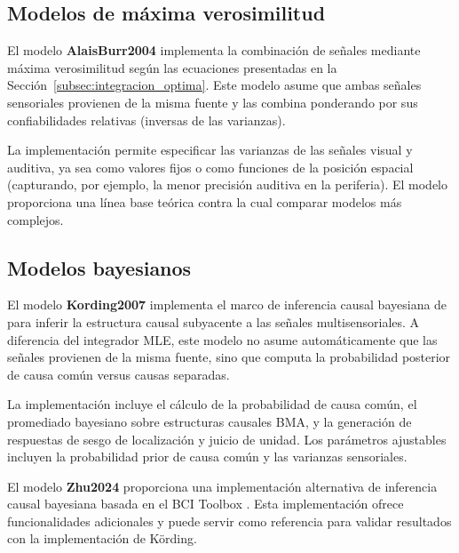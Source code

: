 \subsection{Modelos de máxima verosimilitud}
\label{subsec:snmsi_mle}

El modelo \textbf{AlaisBurr2004} implementa la combinación de señales mediante máxima verosimilitud según las ecuaciones presentadas en la Sección~\ref{subsec:integracion_optima}. Este modelo asume que ambas señales sensoriales provienen de la misma fuente y las combina ponderando por sus confiabilidades relativas (inversas de las varianzas).

La implementación permite especificar las varianzas de las señales visual y auditiva, ya sea como valores fijos o como funciones de la posición espacial (capturando, por ejemplo, la menor precisión auditiva en la periferia). El modelo proporciona una línea base teórica contra la cual comparar modelos más complejos.

\subsection{Modelos bayesianos}
\label{subsec:snmsi_bayesianos}

El modelo \textbf{Kording2007} implementa el marco de inferencia causal bayesiana de \citet{kording2007causal} para inferir la estructura causal subyacente a las señales multisensoriales. A diferencia del integrador MLE, este modelo no asume automáticamente que las señales provienen de la misma fuente, sino que computa la probabilidad posterior de causa común versus causas separadas.

La implementación incluye el cálculo de la probabilidad de causa común, el promediado bayesiano sobre estructuras causales \acrfull{BMA}, y la generación de respuestas de sesgo de localización y juicio de unidad. Los parámetros ajustables incluyen la probabilidad prior de causa común y las varianzas sensoriales.

El modelo \textbf{Zhu2024} proporciona una implementación alternativa de inferencia causal bayesiana basada en el BCI Toolbox \citep{zhu2024bci}. Esta implementación ofrece funcionalidades adicionales y puede servir como referencia para validar resultados con la implementación de Körding.


